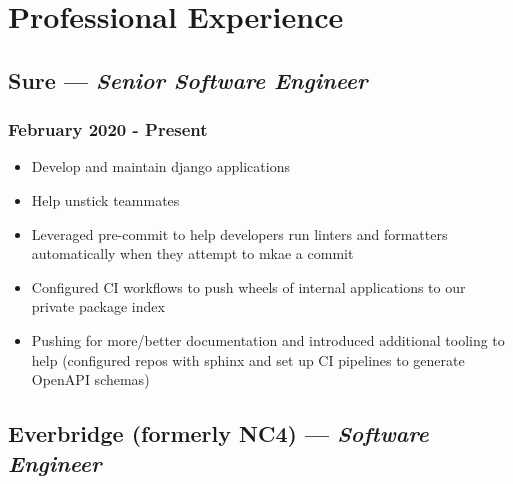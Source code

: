 \documentclass{article}
\begin{document}
\begin{minipage}[t]{.8\textwidth}
\section*{Professional Experience}
\subsection*{Sure  --- \textit{Senior Software Engineer}}
\subsubsection*{February 2020 - Present}
\parbox[t]{.5\textwidth}{\raggedright%
\begin{itemize}
\vspace{-0.5em}
	\item Develop and maintain django applications
	\item Help unstick teammates
	\item Leveraged pre-commit to help developers run linters and formatters automatically when they attempt to mkae a commit
	\item Configured CI workflows to push wheels of internal applications to our private package index
\end{itemize}}
\parbox[t]{.5\textwidth}{\raggedright%
\begin{itemize}
\vspace{-1.5em}
    \item Pushing for more/better documentation and introduced additional tooling to help (configured repos with sphinx and set up CI pipelines to generate OpenAPI schemas)
\end{itemize}}
\vspace{-1.5em}
\subsection*{Everbridge (formerly NC4) --- \textit{Software Engineer}}

\end{minipage}
\end{document}
